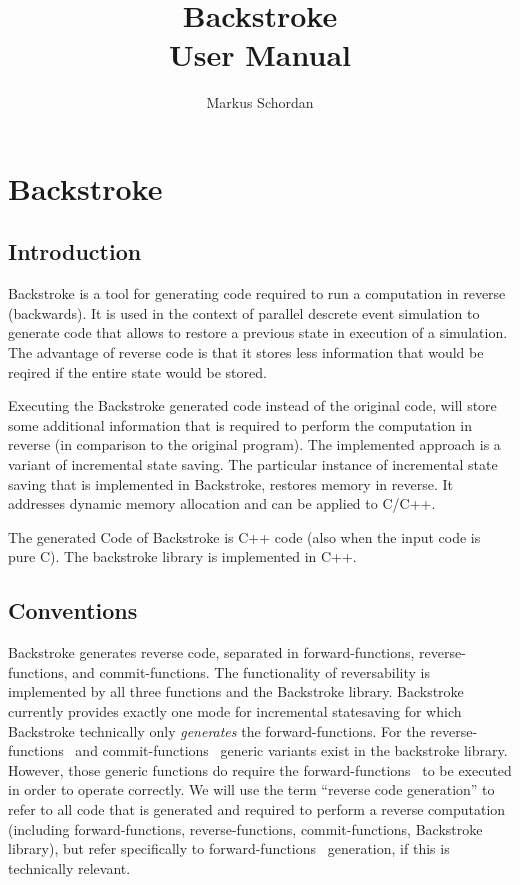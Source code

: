 \documentclass[english,12pt, titlepage]{article}      %
\title{Backstroke \bsshortversion\\ User Manual}  %
\author{Markus Schordan}      %
\newcommand{\forwardfunctions}{forward-functions}
\newcommand{\reversefunctions}{reverse-functions}
\newcommand{\commitfunctions}{commit-functions}
\begin{document}

\maketitle                   %

\tableofcontents        
\clearpage

\section{Backstroke}

\subsection{Introduction}
Backstroke is a tool for generating code required to run a computation
in reverse (backwards). It is used in the context of parallel descrete
event simulation to generate code that allows to restore a previous
state in execution of a simulation. The advantage of reverse code is
that it stores less information that would be reqired if the entire
state would be stored.

Executing the Backstroke generated code instead of the original code, will
store some additional information that is required to perform the
computation in reverse (in comparison to the original program). The
implemented approach is a variant of incremental state saving. The
particular instance of incremental state saving that is implemented in
Backstroke, restores memory in reverse. It addresses dynamic memory
allocation and can be applied to C/C++.

The generated Code of Backstroke is C++ code (also when the input code
is pure C). The backstroke library is implemented in C++.

\subsection{Conventions}

Backstroke generates reverse code, separated in \forwardfunctions,
\reversefunctions, and \commitfunctions. The functionality of reversability is
implemented by all three functions and the Backstroke library. Backstroke currently provides exactly one mode for incremental statesaving for which Backstroke technically only
{\em generates} the \forwardfunctions. For the \reversefunctions~ and \commitfunctions~
generic variants exist in the backstroke library. However, those
generic functions do require the \forwardfunctions~ to be executed in order
to operate correctly. We will use the term ``reverse code generation'' to refer to all code that is generated and required to perform a reverse computation (including \forwardfunctions, \reversefunctions, \commitfunctions, Backstroke library), but refer specifically to \forwardfunctions~ generation, if this is technically relevant. 
\end{document}

